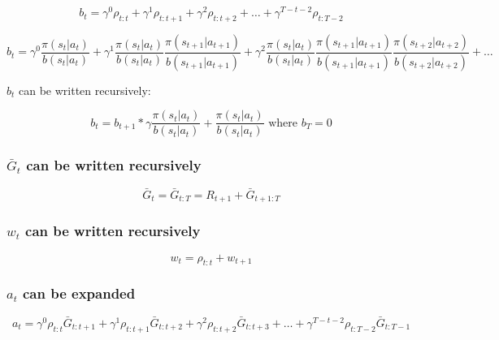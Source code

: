 \documentclass[11pt]{article}
\begin{document}
    \begin{equation}
        b_t = \gamma^0 \rho_{t:t} + \gamma^1 \rho_{t:t+1} + \gamma^2 \rho_{t:t+2} + \dots + \gamma^{T-t-2} \rho_{t:T-2}
    \end{equation}

    \begin{equation}
        b_t = \gamma^0 \frac{\pi(s_{t}|a_{t})}{b(s_{t}|a_{t})} + \gamma^1 \frac{\pi(s_{t}|a_{t})}{b(s_{t}|a_{t})} \frac{\pi(s_{t+1}|a_{t+1})}{b(s_{t+1}|a_{t+1})} + \gamma^2 \frac{\pi(s_{t}|a_{t})}{b(s_{t}|a_{t})} \frac{\pi(s_{t+1}|a_{t+1})}{b(s_{t+1}|a_{t+1})} \frac{\pi(s_{t+2}|a_{t+2})}{b(s_{t+2}|a_{t+2})} + \dots
    \end{equation}

    $b_t$ can be written recursively:

    \begin{equation}
        b_t = b_{t+1} * \gamma \frac{\pi(s_{t}|a_{t})}{b(s_{t}|a_{t})} + \frac{\pi(s_{t}|a_{t})}{b(s_{t}|a_{t})} \text{ where $b_T = 0$}
    \end{equation}


    \subsubsection*{$\bar{G}_{t}$ can be written recursively}

    \begin{equation}
        \bar{G}_{t} = \bar{G}_{t:T} = R_{t+1} + \bar{G}_{t+1:T}
    \end{equation}

    \subsubsection*{$w_{t}$ can be written recursively}

    \begin{equation}
        w_{t} = \rho_{t:t} + w_{t+1}
    \end{equation}


    \subsubsection*{$a_t$ can be expanded}

    \begin{equation}
        a_t = \gamma^0 \rho_{t:t} \bar{G}_{t:t+1} + \gamma^1 \rho_{t:t+1} \bar{G}_{t:t+2} + \gamma^2 \rho_{t:t+2} \bar{G}_{t:t+3} + \dots + \gamma^{T-t-2} \rho_{t:T-2} \bar{G}_{t:T-1}
    \end{equation}
\end{document}
